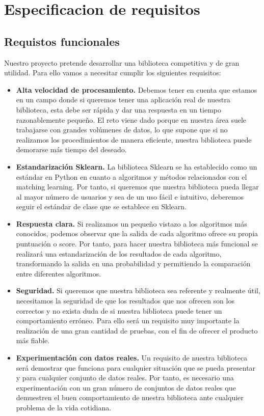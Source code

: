 
\chapter{Especificacion de requisitos}
\section{Requistos funcionales}
Nuestro proyecto pretende desarrollar una biblioteca competitiva y de 
gran utilidad. Para ello vamos a necesitar cumplir los siguientes requisitos:

\begin{itemize}
    \item \textbf{Alta velocidad de procesamiento.} Debemos tener en cuenta
    que estamos en un campo donde si queremos tener una aplicación real de
    nuestra biblioteca, esta debe ser rápida y dar una respuesta en un tiempo
    razonablemente pequeño. El reto viene dado porque en nuestra área suele
    trabajarse con grandes volúmenes de datos, lo que supone que si no realizamos
    los procedimientos de manera eficiente, nuestra biblioteca puede demorarse más
    tiempo del deseado.

    \item \textbf{Estandarización Sklearn.} La biblioteca Sklearn \cite{APIReferenceScikitlearn} 
    se ha establecido como un estándar en Python en cuanto a algoritmos y métodos
    relacionados con el matching learning. Por tanto, si queremos que nuestra biblioteca
    pueda llegar al mayor número de usuarios y sea de un uso fácil e intuitivo, deberemos
    seguir el estándar de clase que se establece en Sklearn.

    \item \textbf{Respuesta clara.} Si realizamos un pequeño vistazo a los algoritmos
    más conocidos, podemos observar que la salida de cada algoritmo ofrece su propia
    puntuación o score. Por tanto, para hacer nuestra biblioteca más funcional se
    realizará una estandarización de los resultados de cada algoritmo, transformando 
    la salida en una probabilidad y permitiendo la comparación entre diferentes algoritmos.

    \item \textbf{Seguridad.} Si queremos que nuestra biblioteca sea referente y realmente
    útil, necesitamos la seguridad de que los resultados que nos ofrecen son los correctos
    y no exista duda de si nuestra biblioteca puede tener un comportamiento erróneo. Para ello
    será un requisito muy importante la realización de una gran cantidad de pruebas, con el fin 
    de ofrecer el producto más fiable.

    \item \textbf{Experimentación con datos reales.} Un requisito de nuestra biblioteca será
    demostrar que funciona para cualquier situación que se pueda presentar y para cualquier
    conjunto de datos reales. Por tanto, es necesario una experimentación con un gran número
    de conjuntos de datos reales que demuestren el buen comportamiento de nuestra biblioteca
    ante cualquier problema de la vida cotidiana.

\end{itemize}

